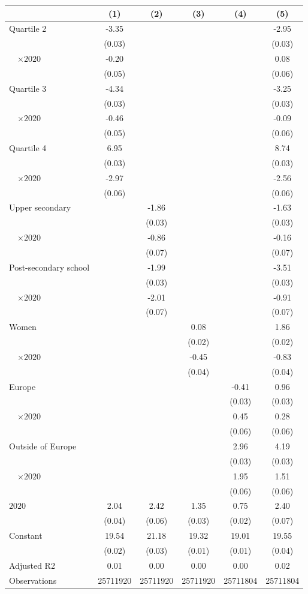 
\begin{tabular}{@{}l*{5}{S[table-format={-}2.2{\tnote{***}}]}@{}}
\toprule
{} & {(1)} & {(2)} & {(3)} & {(4)} & {(5)}\tabularnewline%
\midrule
Quartile 2 & -3.35\tnote{***} &  &  &  & -2.95\tnote{***}\tabularnewline%
 & (0.03) &  &  &  & \vphantom{2} (0.03)\tabularnewline%
~~\(\times 2020\) & -0.20\tnote{***} &  &  &  & 0.08\tabularnewline%
 & (0.05) &  &  &  & \vphantom{1} (0.06)\tabularnewline%
Quartile 3 & -4.34\tnote{***} &  &  &  & -3.25\tnote{***}\tabularnewline%
 & (0.03) &  &  &  & \vphantom{1} (0.03)\tabularnewline%
~~\(\times 2020\) & -0.46\tnote{***} &  &  &  & -0.09\tabularnewline%
 & (0.05) &  &  &  & (0.06)\tabularnewline%
Quartile 4 & 6.95\tnote{***} &  &  &  & 8.74\tnote{***}\tabularnewline%
 & (0.03) &  &  &  & (0.03)\tabularnewline%
~~\(\times 2020\) & -2.97\tnote{***} &  &  &  & -2.56\tnote{***}\tabularnewline%
 & (0.06) &  &  &  & (0.06)\tabularnewline%
Upper secondary &  & -1.86\tnote{***} &  &  & -1.63\tnote{***}\tabularnewline%
 &  & (0.03) &  &  & \vphantom{1} (0.03)\tabularnewline%
~~\(\times 2020\) &  & -0.86\tnote{***} &  &  & -0.16\tnote{*}\tabularnewline%
 &  & (0.07) &  &  & \vphantom{1} (0.07)\tabularnewline%
Post-secondary school &  & -1.99\tnote{***} &  &  & -3.51\tnote{***}\tabularnewline%
 &  & (0.03) &  &  & (0.03)\tabularnewline%
~~\(\times 2020\) &  & -2.01\tnote{***} &  &  & -0.91\tnote{***}\tabularnewline%
 &  & (0.07) &  &  & (0.07)\tabularnewline%
Women &  &  & 0.08\tnote{***} &  & 1.86\tnote{***}\tabularnewline%
 &  &  & (0.02) &  & (0.02)\tabularnewline%
~~\(\times 2020\) &  &  & -0.45\tnote{***} &  & -0.83\tnote{***}\tabularnewline%
 &  &  & (0.04) &  & (0.04)\tabularnewline%
Europe &  &  &  & -0.41\tnote{***} & 0.96\tnote{***}\tabularnewline%
 &  &  &  & (0.03) & \vphantom{1} (0.03)\tabularnewline%
~~\(\times 2020\) &  &  &  & 0.45\tnote{***} & 0.28\tnote{***}\tabularnewline%
 &  &  &  & (0.06) & \vphantom{1} (0.06)\tabularnewline%
Outside of Europe &  &  &  & 2.96\tnote{***} & 4.19\tnote{***}\tabularnewline%
 &  &  &  & (0.03) & (0.03)\tabularnewline%
~~\(\times 2020\) &  &  &  & 1.95\tnote{***} & 1.51\tnote{***}\tabularnewline%
 &  &  &  & (0.06) & (0.06)\tabularnewline%
\midrule
\(2020\) & 2.04\tnote{***} & 2.42\tnote{***} & 1.35\tnote{***} & 0.75\tnote{***} & 2.40\tnote{***}\tabularnewline%
 & (0.04) & (0.06) & (0.03) & (0.02) & (0.07)\tabularnewline%
Constant & 19.54\tnote{***} & 21.18\tnote{***} & 19.32\tnote{***} & 19.01\tnote{***} & 19.55\tnote{***}\tabularnewline%
 & (0.02) & (0.03) & (0.01) & (0.01) & (0.04)\tabularnewline%
\midrule
Adjusted R2 & 0.01 & 0.00 & 0.00 & 0.00 & 0.02\tabularnewline%
Observations & {\num{25711920}} & {\num{25711920}} & {\num{25711920}} & {\num{25711804}} & {\num{25711804}}\tabularnewline%
\bottomrule
\end{tabular}
